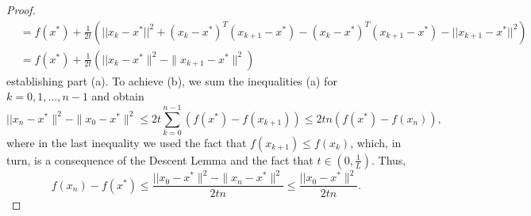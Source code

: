 \documentclass[10pt,a4paper]{article}
\begin{document}
\begin{proof}
\begin{equation*}
\begin{split}
		&= f(x^*)+\frac{1}{2t}\left(||x_k-x^*||^2+(x_k-x^*)^T(x_{k+1}-x^*)-(x_k-x^*)^T(x_{k+1}-x^*) -||x_{k+1}-x^*||^2\right)\\
		&= f(x^*)+\frac{1}{2t}\left(||x_k-x^*\|^2 -\|x_{k+1}-x^*\|^2\right)
	\end{split}
\end{equation*}
establishing part (a). To achieve (b), we sum the inequalities (a) for $k=0,1, \dots, n-1$ and obtain
\begin{equation*}
	||x_n-x^*\|^2 -\|x_0-x^*\|^2 \leq 2t \sum_{k=0}^{n-1} \left(f(x^*)-f(x_{k+1})\right) \leq 2tn(f(x^*)-f(x_n)),
\end{equation*}
where in the last inequality we used the fact that $f(x_{k+1})\leq f(x_k)$, which, in turn, is a consequence of the Descent Lemma and the fact that $t\in(0, \frac{1}{L})$. Thus, 
\begin{equation*}
	f(x_n) -f(x^*) \leq \frac{||x_0-x^*\|^2 -\|x_n-x^*\|^2}{2tn}\leq \frac{||x_0-x^*\|^2}{2tn}.
\end{equation*}
\end{proof}
\end{document}
